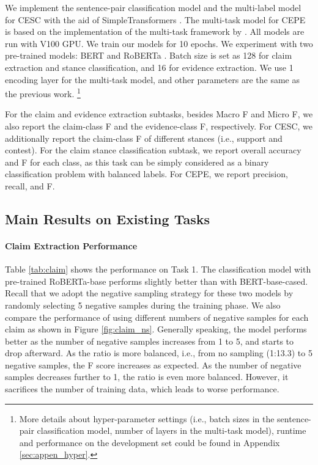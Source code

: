 \documentclass[11pt]{article}
\begin{document}
We implement the sentence-pair classification model and the multi-label model for CESC with the aid of SimpleTransformers \cite{rajapakse2019simpletransformers}.
The multi-task model for CEPE is based on the implementation of the multi-task framework by \citet{cheng2021argument}.
All models are run with V100 GPU.
We train our models for 10 epochs.
We experiment with two pre-trained models: BERT \cite{devlin2019bert} and RoBERTa \cite{liu2019roberta}.
Batch size is set as 128 for claim extraction and stance classification, and 16 for evidence extraction.
We use 1 encoding layer for the multi-task model, and other parameters are the same as the previous work.
\footnote{More details about hyper-parameter settings (i.e., batch sizes in the sentence-pair classification model, number of layers in the multi-task model), runtime and performance on the development set could be found in Appendix \ref{sec:appen_hyper}.}

For the claim and evidence extraction subtasks, besides Macro F and Micro F, we also report the claim-class F and the evidence-class F, respectively.
For CESC, we additionally report the claim-class F of different stances (i.e., support and contest).
For the claim stance classification subtask, we report overall accuracy and F for each class, as this task can be simply considered as a binary classification problem with balanced labels.
For CEPE, we report precision, recall, and F.

\subsection{Main Results on Existing Tasks}






\paragraph{Claim Extraction Performance}
Table \ref{tab:claim} shows the performance on Task 1.
The classification model with pre-trained RoBERTa-base performs slightly better than with BERT-base-cased.
Recall that we adopt the negative sampling strategy for these two models by randomly selecting 5 negative samples during the training phase.
We also compare the performance of using different numbers of negative samples for each claim as shown in Figure \ref{fig:claim_ns}.
Generally speaking, the model performs better as the number of negative samples increases from 1 to 5, and starts to drop afterward.
As the ratio is more balanced, i.e., from no sampling (1:13.3) to 5 negative samples, the F score increases as expected.
As the number of negative samples decreases further to 1, the ratio is even more balanced.
However, it sacrifices the number of training data, which leads to worse performance.
\end{document}
